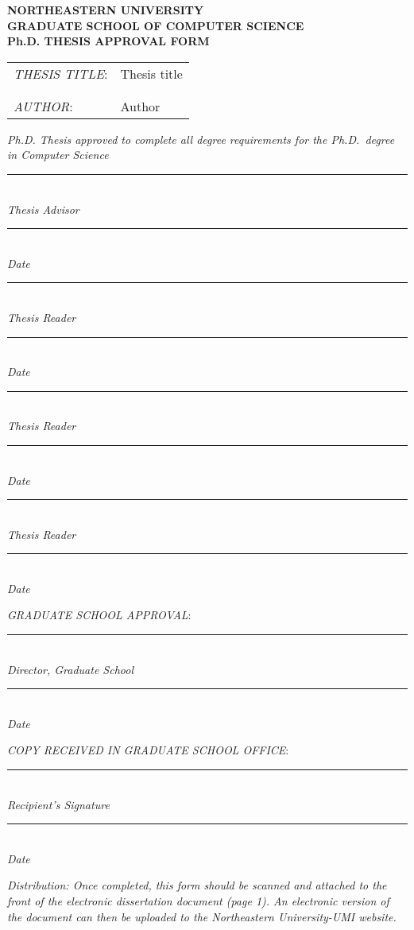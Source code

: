 \documentclass[12pt,oneside]{article}
\newcommand {\Sigline}[1] {\noindent \begin{minipage}{4in}
    \rule {4 in} {0.4 pt} \\
    \centering \emph{#1}
  \end {minipage}
  \hfill
  \begin{minipage} {1.5 in}
    \rule {1.5 in} {0.4 pt} \\
    \centering \emph{Date}
  \end{minipage}}
\newcommand {\Gap}{\vspace{24pt}}
\newcommand {\Smallgap}{\vspace {10pt}}
\begin{document}
\pagestyle {empty}

\vskip -1cm

\begin{centering}
  \bfseries
  NORTHEASTERN UNIVERSITY \\
  GRADUATE SCHOOL OF COMPUTER SCIENCE\\
  Ph.D. THESIS APPROVAL FORM\\
\end{centering}

\vspace {2em}

\noindent
\begin{tabular}{ll}
  \emph{THESIS TITLE}: & Thesis title \\
  & \\
  & \\
  \emph{AUTHOR}: & Author \\
\end{tabular}

\vspace {2 em}

\noindent \emph{\small Ph.D. Thesis approved to complete all degree requirements for the Ph.D.\ degree in Computer Science}

\Smallgap


\Gap

\Sigline {Thesis Advisor}

\Gap

\Sigline {Thesis Reader}

\Gap

\Sigline {Thesis Reader}

\Gap

\Sigline {Thesis Reader}

\Gap

\noindent \emph{GRADUATE SCHOOL APPROVAL}:

\Gap

\Sigline {Director, Graduate School}

\Gap

\noindent \emph{\uppercase{Copy received in graduate school office}}:

\Gap

\Sigline {Recipient's Signature}

\Gap

\noindent
\emph{Distribution: Once completed, this form should be scanned and
attached to the front of the electronic dissertation document (page 1).
An electronic version of the document can then be uploaded to the
Northeastern University-UMI website.  }
\end{document}
